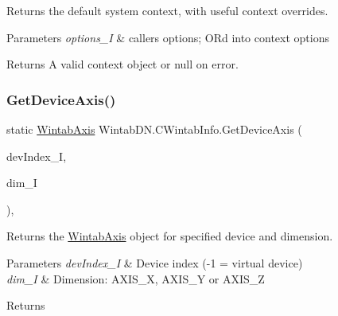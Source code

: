 Returns the default system context, with useful context overrides. 


\begin{DoxyParams}{Parameters}
{\em options\+\_\+I} & caller\textquotesingle{}s options; OR\textquotesingle{}d into context options\\
\hline
\end{DoxyParams}
\begin{DoxyReturn}{Returns}
A valid context object or null on error.
\end{DoxyReturn}
\mbox{\label{class_wintab_d_n_1_1_c_wintab_info_a589c0f32056f42944e7da7a096392fc2}} 
\subsubsection{\texorpdfstring{Get\+Device\+Axis()}{GetDeviceAxis()}}
{\footnotesize\ttfamily static \mbox{\hyperlink{struct_wintab_d_n_1_1_wintab_axis}{Wintab\+Axis}} Wintab\+D\+N.\+C\+Wintab\+Info.\+Get\+Device\+Axis (\begin{DoxyParamCaption}\item[{Int32}]{dev\+Index\+\_\+I,  }\item[{\mbox{\hyperlink{namespace_wintab_d_n_a38705aa38c49c04846399172fa9fd1cd}{E\+Axis\+Dimension}}}]{dim\+\_\+I }\end{DoxyParamCaption})\hspace{0.3cm}{\ttfamily [inline]}, {\ttfamily [static]}}



Returns the \mbox{\hyperlink{struct_wintab_d_n_1_1_wintab_axis}{Wintab\+Axis}} object for specified device and dimension. 


\begin{DoxyParams}{Parameters}
{\em dev\+Index\+\_\+I} & Device index (-\/1 = virtual device)\\
\hline
{\em dim\+\_\+I} & Dimension\+: A\+X\+I\+S\+\_\+X, A\+X\+I\+S\+\_\+Y or A\+X\+I\+S\+\_\+Z\\
\hline
\end{DoxyParams}
\begin{DoxyReturn}{Returns}

\end{DoxyReturn}
\mbox{\label{class_wintab_d_n_1_1_c_wintab_info_a8f2991e434881527d077c2278771919b}} 
